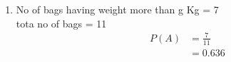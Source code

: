 \renewcommand{\theequation}{\theenumi}
\begin{enumerate}[label=\arabic*.,ref=\thesubsection.\theenumi]
\item No of bags having weight more than g Kg = 7
\\
tota no of bags = 11
\begin{align}
P\left(A\right) &= \frac{7}{11}
\\
&=0.636
\end{align}
\end{enumerate}